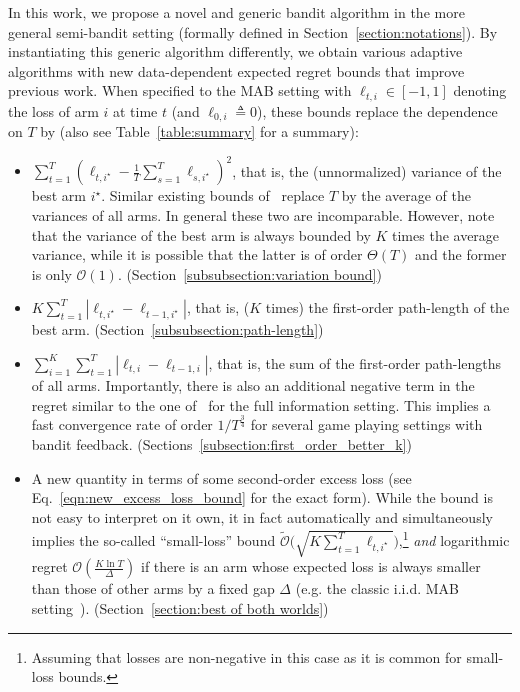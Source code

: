 In this work, we propose a novel and generic bandit algorithm in the more general semi-bandit setting
(formally defined in Section~\ref{section:notations}).
By instantiating this generic algorithm differently,
we obtain various adaptive algorithms with new data-dependent expected regret bounds that improve previous work.
When specified to the MAB setting with $\ell_{t,i} \in [-1,1]$ denoting the loss of arm $i$ at time $t$ (and $\ell_{0,i} \triangleq 0$),
these bounds replace the dependence on $T$ by (also see Table~\ref{table:summary} for a summary):
\begin{itemize}
\item 
$\sum_{t=1}^T (\ell_{t,i^\star} - \frac{1}{T}\sum_{s=1}^T\ell_{s,i^\star})^2$,
that is, the (unnormalized) variance of the best arm $i^\star$.
Similar existing bounds of~\citep{hazan2011better, hazan2011simple, bubeck2017sparsity} replace $T$ by the average of the variances of all arms.
In general these two are incomparable. 
However, note that the variance of the best arm is always bounded by $K$ times the average variance,
while it is possible that the latter is of order $\Theta(T)$ and the former is only $\mathcal{O}(1)$. (Section~\ref{subsubsection:variation bound})

\item
$K\sum_{t=1}^T |\ell_{t,i^\star} - \ell_{t-1,i^\star}|$, that is, ($K$ times) the first-order path-length of the best arm. (Section~\ref{subsubsection:path-length})

\item
$\sum_{i=1}^K\sum_{t=1}^T |\ell_{t,i} - \ell_{t-1,i}|$, that is, the sum of the first-order path-lengths of all arms.
Importantly, there is also an additional negative term in the regret similar to the one of~\citep{syrgkanis2015fast} for the full information setting.
This implies a fast convergence rate of order $1/T^\frac{3}{4}$ for several game playing settings with bandit feedback. 
(Sections~\ref{subsection:first_order_better_k})

\item
A new quantity in terms of some second-order excess loss (see Eq.~\eqref{eqn:new_excess_loss_bound} for the exact form). 
While the bound is not easy to interpret on it own, 
it in fact automatically and simultaneously implies the so-called ``small-loss'' bound $\tilde{\mathcal{O}}\Big(\sqrt{K\sum_{t=1}^T \ell_{t,i^\star}}\Big)$,\footnote{%
Assuming that losses are non-negative in this case as it is common for small-loss bounds.
}
{\it and} logarithmic regret $\mathcal{O}(\frac{K\ln T}{\Delta})$ if there is an arm whose expected loss is always smaller than those of other arms by a fixed gap $\Delta$
(e.g. the classic i.i.d. MAB setting~\citep{lai1985asymptotically}). (Section~\ref{section:best of both worlds})

\end{itemize}

